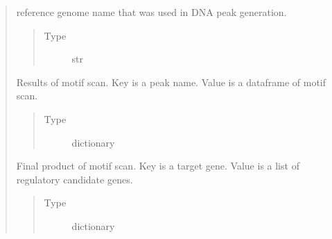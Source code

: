 \documentclass[letterpaper,10pt,english]{sphinxmanual}
\begin{document}
\begin{quote}
\begin{fulllineitems}
\begin{fulllineitems}
\begin{quote}
\begin{description}
\end{description}\end{quote}

\end{fulllineitems}


\begin{fulllineitems}
\label{\detokenize{modules/celloracle.motif_analysis:celloracle.motif_analysis.TFinfo.ref_genome}}
reference genome name that was used in DNA peak generation.
\begin{quote}\begin{description}
\item[{Type}] \leavevmode
str

\end{description}\end{quote}

\end{fulllineitems}


\begin{fulllineitems}
\label{\detokenize{modules/celloracle.motif_analysis:celloracle.motif_analysis.TFinfo.scanned_df}}
Results of motif scan. Key is a peak name. Value is a dataframe of motif scan.
\begin{quote}\begin{description}
\item[{Type}] \leavevmode
dictionary

\end{description}\end{quote}

\end{fulllineitems}


\begin{fulllineitems}
\label{\detokenize{modules/celloracle.motif_analysis:celloracle.motif_analysis.TFinfo.dic_targetgene2TFs}}
Final product of motif scan. Key is a target gene. Value is a list of regulatory candidate genes.
\begin{quote}\begin{description}
\item[{Type}] \leavevmode
dictionary


\end{description}
\end{quote}
\end{fulllineitems}
\end{fulllineitems}
\end{quote}
\end{document}

